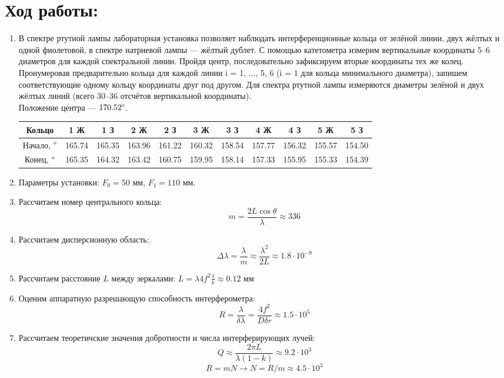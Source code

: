 \section*{Ход работы:}
\begin{enumerate}
    \item В спектре ртутной лампы лабораторная установка позволяет наблюдать интерференционные кольца от зелёной линии, двух жёлтых и одной фиолетовой, в спектре натриевой лампы — жёлтый дублет. С помощью катетометра измерим вертикальные координаты 5–6 диаметров для каждой спектральной линии. Пройдя центр, последовательно зафиксируем вторые координаты тех же колец. Пронумеровав предварительно кольца для каждой линии i = 1, ..., 5, 6 (i = 1 для кольца минимального диаметра), запишем соответствующие одному кольцу координаты друг под другом. Для спектра ртутной лампы измеряются диаметры зелёной и двух жёлтых линий (всего 30–36 отсчётов вертикальной координаты). \\
    Положение центра --- $170.52\degree$. \\
    \begin{tabu} to 1\textwidth{|c|c|c|c|c|c|c|c|c|c|c|}
    \hline
    Кольцо & 1 Ж & 1 З & 2 Ж & 2 З & 3 Ж & 3 З & 4 Ж & 4 З & 5 Ж & 5 З \\
    \hline
    Начало, $\degree$ & 165.74 & 165.35 & 163.96 & 161.22 & 160.32 & 158.54 & 157.77 & 156.32 & 155.57 & 154.50 \\
    \hline
    Конец, $\degree$ & 165.35 & 164.32 & 163.42 & 160.75 & 159.95 & 158.14 & 157.33 & 155.95 & 155.33 & 154.39 \\
    \hline
    \end{tabu}
    \item Параметры установки: $F_0 = 50$ мм, $F_1 = 110$ мм.
    \item Рассчитаем номер центрального кольца:
    \[ m = \frac{2L \cos{\theta}}{\lambda} \approx 336\]
    \item Рассчитаем дисперсионную область:
    \[ \Delta\lambda = \frac{\lambda}{m} \approx \frac{\lambda^2}{2L} \approx 1.8 \cdot 10^{-9} \]
    \item Рассчитаем расстояние $L$ между зеркалами:
    $L = \lambda 4 f^2 \frac{1}{k} \approx 0.12$ мм 
    \item Оценим аппаратную разрешающую способность интерферометра:
    \[ R = \frac{\lambda}{\delta\lambda} = \frac{4f^2}{D\delta r} \approx 1.5 \cdot 10^5\] 
    \item Рассчитаем теоретичские значения добротности и числа интерферирующих лучей:
    \[ Q \approx \frac{2\pi L}{\lambda(1- k)} \approx 9.2 \cdot 10^3\]
    \[ R = mN \rightarrow N = R / m \approx 4.5 \cdot 10^3 \]
\end{enumerate}